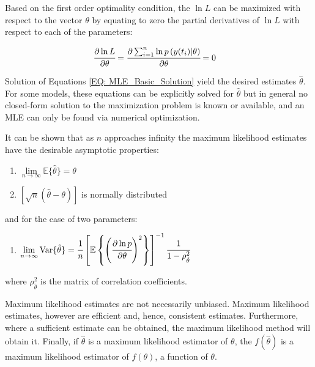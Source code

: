 \documentclass[../Article_Model_Parameters.tex]{subfiles}
\begin{document}
		
		Based on the first order optimality condition, the $\ln L$ can be maximized with respect to the vector $\theta$ by equating to zero the partial derivatives of $\ln L$ with respect to each of the parameters:
		
		{\footnotesize
			\begin{align}\label{EQ: MLE_Basic_Solution}
				\cfrac{\partial \ln L}{\partial \theta} &= \cfrac{\partial \sum_{i=1}^{n} \ln p\left( y(t_i) | \theta \right) }{\partial \theta} = 0 
		\end{align} }
		
		Solution of Equations \ref{EQ: MLE_Basic_Solution} yield the desired estimates $\hat{\theta}$. For some models, these equations can be explicitly solved for $\hat{\theta}$ but in general no closed-form solution to the maximization problem is known or available, and an MLE can only be found via numerical optimization.
		
		\iffalse
		
		It can be shown that as $n$ approaches infinity the maximum likelihood estimates have the desirable asymptotic properties:
		
		\begin{enumerate}[label=(\arabic*)]
			\item {\footnotesize $\lim\limits_{n \rightarrow \infty} \mathbb{E}\{\hat{\theta}\} = \theta$ }
			\item {\footnotesize $\left[ \sqrt{n}\left( \hat{\theta} - \theta \right) \right]$ } is normally distributed
		\end{enumerate}
		and for the case of two parameters:
		
		\begin{enumerate}[resume,label=(\arabic*)]
			\item {\footnotesize $\lim\limits_{n \rightarrow \infty} \text{Var}\{\hat{\theta}\} = \cfrac{1}{n} \left[ \mathbb{E} \left\{ \left( \cfrac{\partial \ln p}{\partial \theta} \right)^2 \right\} \right]^{-1} \cfrac{1}{1-\rho^2_{\hat{\theta}}} $ } \label{Assumption_MLE}
		\end{enumerate}
		
		where $\rho^2_{\hat{\theta}}$ is the matrix of correlation coefficients.
		
		Maximum likelihood estimates are not necessarily unbiased. Maximum likelihood estimates, however are efficient and, hence, consistent estimates. Furthermore, where a sufficient estimate can be obtained, the maximum likelihood method will obtain it. Finally, if $\hat{\theta}$ is a maximum likelihood estimator of $\theta$, the $f\left( \hat{\theta} \right)$ is a maximum likelihood estimator of $f\left( \theta \right)$, a function of $\theta$.
		
\end{document}
